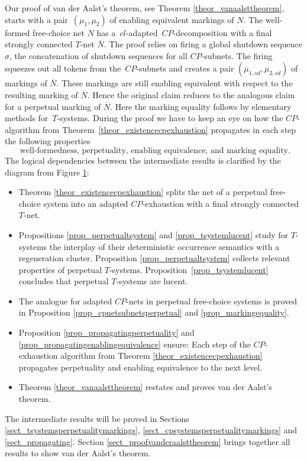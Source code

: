 \documentclass{fundam}
\begin{document}
\medskip\noindent Our proof of van der Aalst's theorem, see Theorem \ref{theor_vanaalsttheorem}, starts with a \mbox{pair $(\mu_1,\mu_2)$} of enabling equi\-valent markings of $N$. The well-formed free-choice net $N$ has \mbox{a $cl$-adapted $CP$-decomposition} with a final strongly connected $T$-net $\overline{N}$. The proof relies on firing a global shutdown sequence $\sigma$, the concatenation of shutdown sequences for all $CP$-subnets. The firing squeezes out all tokens from \mbox{the $CP$-subnets} and creates a pair $(\overline{\mu}_{1,sd},\overline{\mu}_{2,sd})$ of markings of $\overline{N}$. These markings are still enabling equivalent with respect to the resulting marking of $\overline{N}$. Hence the original claim reduces to the analogous claim for a perpetual marking of $\overline{N}$. Here the marking equality follows by elementary methods \mbox{for $T$-systems}. During the proof we have to keep an eye on how the $CP$-algorithm from \mbox{Theorem \ref{theor_existencecpexhaustion}} propagates in each step the following properties
$$\text{ well-formedness, perpetuality, enabling equivalence, and marking equality}.$$
The logical dependencies between the intermediate results is clarified by the diagram from Figure \ref{fig_planofproof}:
\begin{figure}[omitted: a diagram of this paper's results, not reproduced here]\label{fig_planofproof}\end{figure}

\begin{itemize}
\item Theorem \ref{theor_existencecpexhaustion}	splits the net of a perpetual free-choice system into an adapted $CP$-exhaustion with a final
strongly connected $T$-net.

\item Propositions \ref{prop_perpetualtsystem} and \ref{prop_tsystemlucent} study for $T$-systems the interplay of their deterministic occurrence semantics with a regeneration cluster. Proposition \ref{prop_perpetualtsystem} collects relevant properties of  perpetual $T$-systems.
    Proposition~\ref{prop_tsystemlucent} concludes that perpetual $T$-systems are lucent.

\item The analogue for adapted $CP$-nets in perpetual free-choice systems is proved in Proposition \ref{prop_cpnetsubnetsperpetual} and \ref{prop_markingequality}.

\item Proposition \ref{prop_propagatingperpetuality} and \ref{prop_propagatingenablingequivalence} ensure: Each step of the $CP$-exhaustion algorithm from
Theorem \ref{theor_existencecpexhaustion} propagates perpetuality and enabling equivalence to the next level.

\item Theorem \ref{theor_vanaalsttheorem} restates and proves van der Aalst's theorem.
\end{itemize}
\noindent
The intermediate results will be proved in Sections \ref{sect_tsystemsperpetualitymarkings}, \ref{sect_cpsystemsperpetualitymarkings} and \ref{sect_propagating}. Section \ref{sect_proofvanderaalsttheorem} brings together all results to show van der Aalst's theorem.
\end{document}
